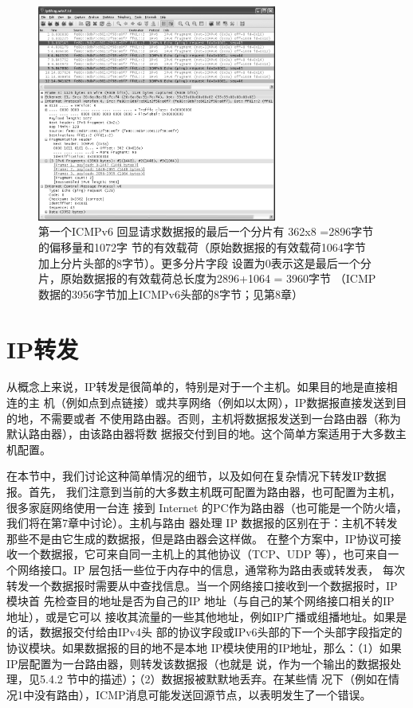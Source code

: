\begin{figure}[!htb]
  \centering
  \includegraphics[width=0.7\textwidth]{imgs/5/5-15.png}
  \caption{第一个ICMPv6 回显请求数据报的最后一个分片有 362x8 =2896字节的偏移量和1072字
    节的有效载荷（原始数据报的有效载荷1064字节加上分片头部的8字节）。更多分片字段
    设置为0表示这是最后一个分片，原始数据报的有效载荷总长度为2896+1064 = 3960字节
  （ICMP 数据的3956字节加上ICMPv6头部的8字节；见第8章）}
\end{figure}

\section{IP转发}

从概念上来说，IP转发是很简单的，特别是对于一个主机。如果目的地是直接相连的主
机（例如点到点链接）或共享网络（例如以太网），IP数据报直接发送到目的地，不需要或者
不使用路由器。否则，主机将数据报发送到一台路由器（称为默认路由器），由该路由器将数
据报交付到目的地。这个简单方案适用于大多数主机配置。

在本节中，我们讨论这种简单情况的细节，以及如何在复杂情况下转发IP数据报。首先，
我们注意到当前的大多数主机既可配置为路由器，也可配置为主机，很多家庭网络使用一台连
接到 Internet 的PC作为路由器（也可能是一个防火墙，我们将在第7章中讨论）。主机与路由
器处理 IP 数据报的区别在于：主机不转发那些不是由它生成的数据报，但是路由器会这样做。
在整个方案中，IP协议可接收一个数据报，它可来自同一主机上的其他协议（TCP、UDP
等），也可来自一个网络接口。IP 层包括一些位于内存中的信息，通常称为路由表或转发表，
每次转发一个数据报时需要从中查找信息。当一个网络接口接收到一个数据报时，IP模块首
先检查目的地址是否为自己的IP 地址（与自己的某个网络接口相关的IP 地址），或是它可以
接收其流量的一些其他地址，例如IP广播或组播地址。如果是的话，数据报交付给由IPv4头
部的协议字段或IPv6头部的下一个头部字段指定的协议模块。如果数据报的目的地不是本地
IP模块使用的IP地址，那么：（1）如果IP层配置为一台路由器，则转发该数据报（也就是
说，作为一个输出的数据报处理，见5.4.2 节中的描述）；（2）数据报被默默地丢弃。在某些情
况下（例如在情况1中没有路由），ICMP消息可能发送回源节点，以表明发生了一个错误。

